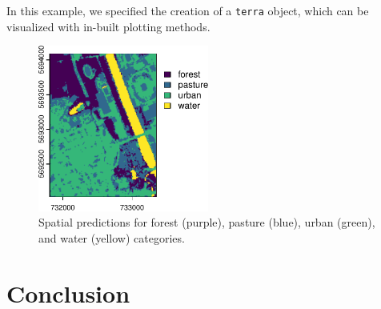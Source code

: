 In this example, we specified the creation of a \texttt{terra} object,
which can be visualized with in-built plotting methods.

\begin{Shaded}
\begin{Highlighting}[]
 \NormalTok{(}\NormalTok{, }\NormalTok{, }\NormalTok{,}
  \NormalTok{, }\NormalTok{, }\NormalTok{, }\NormalTok{))}
\end{Highlighting}
\end{Shaded}

\begin{figure}[H]

{\centering \includegraphics[width=0.5\textwidth,height=0.5\textheight]{chapters/chapter13/beyond_regression_and_classification_files/figure-pdf/fig-beyond-raster-1.pdf}

}

\caption{\label{fig-beyond-raster}Spatial predictions for forest
(purple), pasture (blue), urban (green), and water (yellow) categories.}

\end{figure}

\hypertarget{conclusion-10}{%
\section{Conclusion}\label{conclusion-10}}

